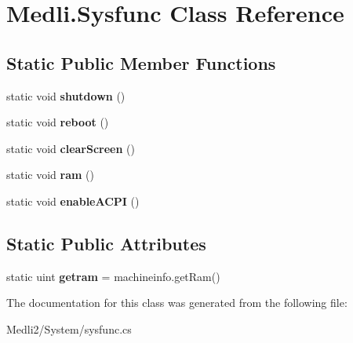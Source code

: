 \hypertarget{class_medli_1_1_sysfunc}{}\section{Medli.\+Sysfunc Class Reference}
\label{class_medli_1_1_sysfunc}
\subsection*{Static Public Member Functions}
\begin{DoxyCompactItemize}
\item 
\mbox{\label{class_medli_1_1_sysfunc_a9d2632a9caf5a52426abaaf1658c6ebf}} 
static void {\bfseries shutdown} ()
\item 
\mbox{\label{class_medli_1_1_sysfunc_a7b0ccec24fc69eb4452f2435f9bc0fb7}} 
static void {\bfseries reboot} ()
\item 
\mbox{\label{class_medli_1_1_sysfunc_a2ef849629e10afd861b25fb6cadc3a14}} 
static void {\bfseries clear\+Screen} ()
\item 
\mbox{\label{class_medli_1_1_sysfunc_a828f20bb86bd16ee09316d1d2cfb24d6}} 
static void {\bfseries ram} ()
\item 
\mbox{\label{class_medli_1_1_sysfunc_aa18b47cfadbb89da866bd3bce1362e12}} 
static void {\bfseries enable\+A\+C\+PI} ()
\end{DoxyCompactItemize}
\subsection*{Static Public Attributes}
\begin{DoxyCompactItemize}
\item 
\mbox{\label{class_medli_1_1_sysfunc_ac7ec6c890a85ed9006293c5a90e219ee}} 
static uint {\bfseries getram} = machineinfo.\+get\+Ram()
\end{DoxyCompactItemize}


The documentation for this class was generated from the following file\+:\begin{DoxyCompactItemize}
\item 
Medli2/\+System/sysfunc.\+cs\end{DoxyCompactItemize}
